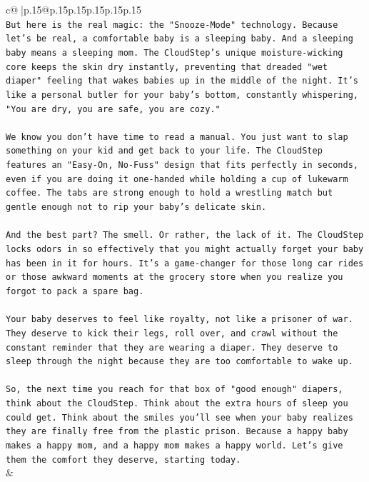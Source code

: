 \documentclass{article}
\begin{document}
{\begin{supertabular}{c@{$\;$}|p{.15\linewidth}@{}p{.15\linewidth}p{.15\linewidth}p{.15\linewidth}p{.15\linewidth}p{.15\linewidth}}
{{{\\ 
\texttt{But here is the real magic: the "Snooze{-}Mode" technology. Because let's be real, a comfortable baby is a sleeping baby. And a sleeping baby means a sleeping mom. The CloudStep's unique moisture{-}wicking core keeps the skin dry instantly, preventing that dreaded "wet diaper" feeling that wakes babies up in the middle of the night. It's like a personal butler for your baby's bottom, constantly whispering, "You are dry, you are safe, you are cozy."} \\
\\ 
\texttt{We know you don't have time to read a manual. You just want to slap something on your kid and get back to your life. The CloudStep features an "Easy{-}On, No{-}Fuss" design that fits perfectly in seconds, even if you are doing it one{-}handed while holding a cup of lukewarm coffee. The tabs are strong enough to hold a wrestling match but gentle enough not to rip your baby's delicate skin.} \\
\\ 
\texttt{And the best part? The smell. Or rather, the lack of it. The CloudStep locks odors in so effectively that you might actually forget your baby has been in it for hours. It's a game{-}changer for those long car rides or those awkward moments at the grocery store when you realize you forgot to pack a spare bag.} \\
\\ 
\texttt{Your baby deserves to feel like royalty, not like a prisoner of war. They deserve to kick their legs, roll over, and crawl without the constant reminder that they are wearing a diaper. They deserve to sleep through the night because they are too comfortable to wake up.} \\
\\ 
\texttt{So, the next time you reach for that box of "good enough" diapers, think about the CloudStep. Think about the extra hours of sleep you could get. Think about the smiles you'll see when your baby realizes they are finally free from the plastic prison. Because a happy baby makes a happy mom, and a happy mom makes a happy world. Let's give them the comfort they deserve, starting today.} \\
            }
        }
    }
    & \\ \\


\end{supertabular}}
\end{document}
